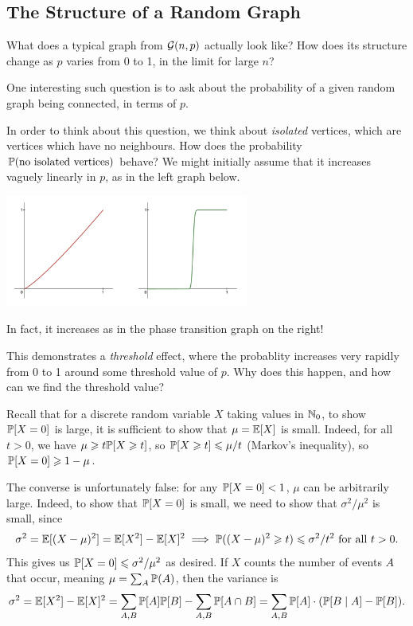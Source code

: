 \documentclass{article}
\begin{document}

\subsection{The Structure of a Random Graph}

What does a typical graph from $\calG(n, p)$ actually look like? How does its structure change as $p$ varies from 0 to 1, in the limit for large $n$?

One interesting such question is to ask about the probability of a given random graph being connected, in terms of $p$.

In order to think about this question, we think about \textit{isolated} vertices, which are vertices which have no neighbours. How does the probability $\P(\text{no isolated vertices})$ behave? We might initially assume that it increases vaguely linearly in $p$, as in the left graph below.

\begin{center}
	\includegraphics[width=0.6\textwidth]{figures/phase-transition.png}
\end{center}

In fact, it increases as in the phase transition graph on the right!

This demonstrates a \textit{threshold} effect, where the probablity increases very rapidly from 0 to 1 around some threshold value of $p$. Why does this happen, and how can we find the threshold value?

\begin{remark}
    Recall that for a discrete random variable $X$ taking values in $\N_0$, to show $\P[X = 0]$ is large, it is sufficient to show that $\mu = \E[X]$ is small. Indeed, for all $t > 0$, we have $\mu \geq t \P[X \geq t]$, so $\P[X \geq t] \leq \mu / t$ (Markov's inequality), so $\P[X = 0] \geq 1 - \mu$.
    
    The converse is unfortunately false: for any $\P[X = 0] < 1$, $\mu$ can be arbitrarily large. Indeed, to show that $\P[X = 0]$ is small, we need to show that $\sigma^2/\mu^2$ is small, since
    \[
	\sigma^2 = \E[(X - \mu)^2] = \E[X^2] - \E[X]^2 \implies \P((X - \mu)^2 \geq t) \leq \sigma^2/t^2 \text{ for all $t > 0$}.
	\]
	This gives us $\P[X = 0] \leq \sigma^2/\mu^2$ as desired. If $X$ counts the number of events $A$ that occur, meaning $\mu = \sum_A \P(A)$, then the variance is
	\[
	\sigma^2 = \E[X^2] - \E[X]^2 = \sum_{A,B}\P[A]\P[B] - \sum_{A,B} \P[A \cap B] = \sum_{A,B} \P[A] \cdot (\P[B \mid A] - \P[B]).
	\]
\end{remark}
\end{document}
